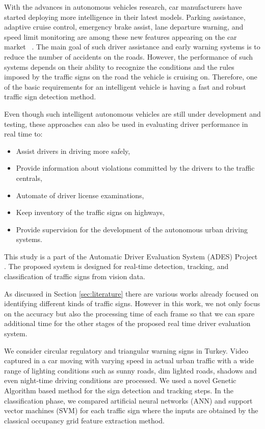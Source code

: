 \documentclass[review,number]{elsarticle}
\begin{document}
With the advances in autonomous vehicles research, car manufacturers have started deploying more intelligence in their latest models. Parking assistance, adaptive cruise control, emergency brake assist, lane departure warning, and speed limit monitoring are among these new features appearing on the car market ~\cite{miscbib02, miscbib03}.  The main goal of such driver assistance and early warning systems is to reduce the number of accidents on the roads. However, the performance of such systems depends on their ability to recognize the conditions and the rules imposed by the traffic signs on the road the vehicle is cruising on. Therefore, one of the basic requirements for an intelligent vehicle is  having a fast and robust traffic sign detection method.

Even though such intelligent autonomous  vehicles are still under development and testing, these approaches can also be used in evaluating driver performance in real time to:

\begin{itemize}
    \item Assist drivers in driving more safely,
    \item Provide information about violations committed by the drivers to the traffic centrals,
    \item Automate of driver license examinations,
    \item Keep inventory of the traffic signs on highways,
    \item Provide supervision for the development of the autonomous urban driving systems.
\end{itemize}

This study is a part of the Automatic Driver Evaluation System (ADES) Project \cite{miscbib04}. The proposed system is designed for real-time detection, tracking, and classification of traffic signs from vision data. 

As discussed in Section \ref{sec:literature} there are various works already focused on identifying different kinds of traffic signs. However in this work, we not only focus on the accuracy but also the processing time of each frame so that we can spare additional time for the other stages of the proposed real time driver evaluation system.

We consider circular regulatory and triangular warning signs in Turkey.  Video captured in a car moving with varying speed in actual urban traffic with a wide range of lighting conditions such as sunny roads, dim lighted roads, shadows and even night-time driving conditions are processed. We used a novel Genetic Algorithm based method for the sign detection and tracking steps.  In the classification phase, we compared artificial neural networks (ANN) and support vector machines (SVM) for each traffic sign where the inputs are obtained by the classical occupancy grid feature extraction method.
\end{document}
